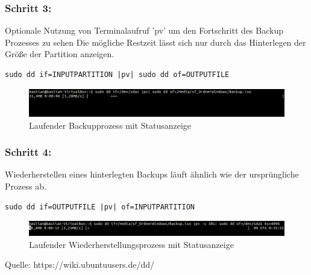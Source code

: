 \subsubsection*{Schritt 3:}
Optionale Nutzung von Terminalaufruf 'pv' um den Fortschritt des Backup Prozesses zu sehen Die mögliche Restzeit lässt sich nur durch das Hinterlegen der Größe der Partition anzeigen.
\begin{lstlisting}
sudo dd if=INPUTPARTITION |pv| sudo dd of=OUTPUTFILE
\end{lstlisting}
\begin{figure}[ht]
\includegraphics[width=\textwidth]{pictures/Bastian/BILD2_pv}
\caption{Laufender Backupprozess mit Statusanzeige}
\end{figure}
\subsubsection*{Schritt 4:}
Wiederherstellen eines hinterlegten Backups läuft ähnlich wie der ursprüngliche Prozess ab.
\begin{lstlisting}
sudo dd if=OUTPUTFILE |pv| of=INPUTPARTITION
\end{lstlisting}
\begin{figure}[ht]
\includegraphics[width=\textwidth]{pictures/Bastian/BILD3_pv}
\caption{Laufender Wiederherstellungsprozess mit Statusanzeige}
\end{figure}
Quelle: https://wiki.ubuntuusers.de/dd/ \cite{dd}
\newpage %

